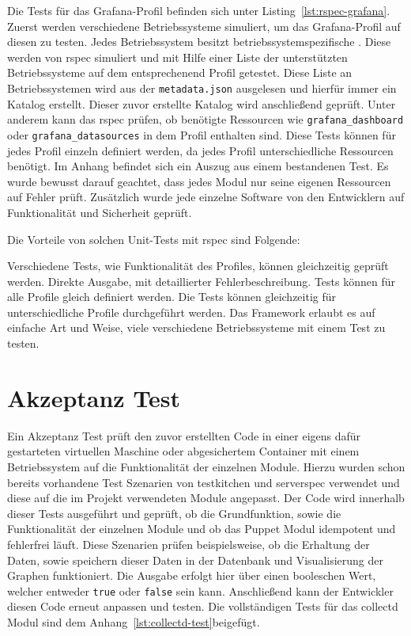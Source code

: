 Die Tests für das Grafana\hyp{}Profil befinden sich unter
Listing~\ref{lst:rspec-grafana}.  Zuerst werden verschiedene Betriebssysteme
simuliert, um das Grafana\hyp{}Profil auf diesen zu testen. Jedes
Betriebssystem besitzt betriebssystemspezifische . Diese
werden von rspec simuliert und mit Hilfe einer Liste der unterstützten
Betriebssysteme auf dem entsprechenend Profil getestet. Diese Liste an
Betriebssystemen wird aus der \texttt{metadata.json} ausgelesen und hierfür
immer ein Katalog erstellt.  Dieser zuvor erstellte Katalog wird anschließend
geprüft. Unter anderem kann das rspec prüfen, ob benötigte Ressourcen wie
\texttt{grafana\_dashboard} oder \texttt{grafana\_datasources} in dem Profil
enthalten sind. Diese Tests können für jedes Profil einzeln definiert werden,
da jedes Profil unterschiedliche Ressourcen benötigt. Im Anhang befindet sich
ein Auszug aus einem bestandenen Test. Es wurde bewusst darauf geachtet, dass
jedes Modul nur seine eigenen Ressourcen auf Fehler prüft. Zusätzlich wurde
jede einzelne Software von den Entwicklern auf Funktionalität und Sicherheit
geprüft.

Die Vorteile von solchen Unit\hyp{}Tests mit rspec sind Folgende:

\begin{outline}
  \1 Verschiedene Tests, wie Funktionalität des Profiles, können gleichzeitig
  geprüft werden.
  \1 Direkte Ausgabe, mit detaillierter Fehlerbeschreibung.
  \1 Tests können für alle Profile gleich definiert werden.
  \1 Die Tests können gleichzeitig für unterschiedliche Profile durchgeführt
  werden.
  \1 Das Framework erlaubt es auf einfache Art und Weise, viele verschiedene
  Betriebssysteme mit einem Test zu testen.
\end{outline}
\mr%

\section{Akzeptanz Test}
Ein Akzeptanz Test prüft den zuvor erstellten Code in einer eigens dafür
gestarteten virtuellen Maschine oder abgesichertem Container mit einem
Betriebssystem auf die Funktionalität der einzelnen Module. Hierzu wurden schon
bereits vorhandene Test Szenarien von \gls{testkitchen} und \gls{serverspec}
verwendet und diese auf die im Projekt verwendeten Module angepasst. Der Code
wird innerhalb dieser Tests ausgeführt und geprüft, ob die Grundfunktion, sowie
die Funktionalität der einzelnen Module und ob das Puppet Modul idempotent und
fehlerfrei läuft. Diese Szenarien prüfen beispielsweise, ob die Erhaltung der
Daten, sowie speichern dieser Daten in der Datenbank und Visualisierung der
Graphen funktioniert. Die Ausgabe erfolgt hier über einen booleschen Wert,
welcher entweder \texttt{true} oder \texttt{false} sein kann. Anschließend
kann der Entwickler diesen Code erneut anpassen und testen. Die vollständigen
Tests für das collectd Modul sind dem Anhang~\ref{lst:collectd-test}beigefügt.

